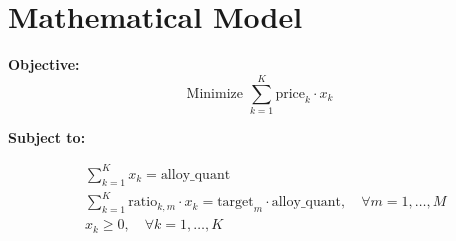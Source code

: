 \documentclass{article}
\begin{document}
\section*{Mathematical Model}

\textbf{Objective:}
\[ 
\text{Minimize } \sum_{k=1}^{K} \text{price}_k \cdot x_k 
\]

\textbf{Subject to:}

\begin{align*}
& \sum_{k=1}^{K} x_k = \text{alloy\_quant} \\
& \sum_{k=1}^{K} \text{ratio}_{k,m} \cdot x_k = \text{target}_m \cdot \text{alloy\_quant}, \quad \forall m = 1, \ldots, M \\
& x_k \geq 0, \quad \forall k = 1, \ldots, K 
\end{align*}
\end{document}
